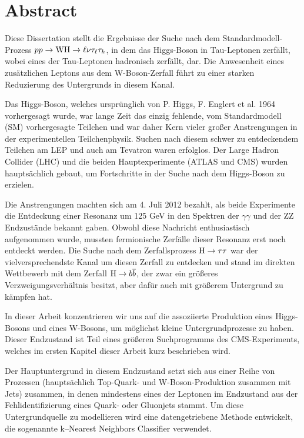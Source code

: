 \chapter*{Abstract}

Diese Dissertation stellt die Ergebnisse der Suche nach dem Standardmodell-Prozess $pp \rightarrow \mathrm{W}\mathrm{H} \rightarrow \ell \nu \tau_\ell \tau_h$, in dem das Higgs-Boson in Tau-Leptonen zerf\"allt, wobei eines der Tau-Leptonen hadronisch zerf\"allt, dar. Die Anwesenheit eines zus\"atzlichen Leptons aus dem W-Boson-Zerfall f\"uhrt zu einer starken Reduzierung des Untergrunds in diesem Kanal.

Das Higgs-Boson, welches urspr\"unglich von P. Higgs, F. Englert et al. 1964 vorhergesagt wurde, war lange Zeit das einzig fehlende, vom Standardmodell (SM) vorhergesagte Teilchen und war daher Kern vieler gro\ss{}er Anstrengungen in der experimentellen Teilchenphysik. Suchen nach diesem schwer zu entdeckendem Teilchen am LEP und auch am Tevatron waren erfolglos. Der Large Hadron Collider (LHC) und die beiden Hauptexperimente (ATLAS und CMS) wurden haupts\"achlich gebaut, um Fortschritte in der Suche nach dem Higgs-Boson zu erzielen.

Die Anstrengungen machten sich am 4. Juli 2012 bezahlt, als beide Experimente die Entdeckung einer Resonanz um 125 GeV in den Spektren der $\gamma \gamma$ und der ZZ Endzust\"ande bekannt gaben. Obwohl diese Nachricht enthusiastisch aufgenommen wurde, mussten fermionische Zerf\"alle dieser Resonanz erst noch entdeckt werden. Die Suche nach dem Zerfallsprozess $\mathrm{H} \rightarrow \tau \tau$ war der vielversprechendste Kanal um diesen Zerfall zu entdecken und stand im direkten Wettbewerb mit dem Zerfall $\mathrm{H} \rightarrow b\overline{b}$, der zwar ein gr\"o\ss{}eres Verzweigungsverh\"altnis besitzt, aber daf\"ur auch mit gr\"o\ss{}erem Untergrund zu k\"ampfen hat.

In dieser Arbeit konzentrieren wir uns auf die assoziierte Produktion eines Higgs-Bosons und eines W-Bosons, um m\"oglichst kleine Untergrundprozesse zu haben. Dieser Endzustand ist Teil eines gr\"o\ss{}eren Suchprogramms des CMS-Experiments, welches im ersten Kapitel dieser Arbeit kurz beschrieben wird.

Der Hauptuntergrund in diesem Endzustand setzt sich aus einer Reihe von Prozessen (haupts\"achlich Top-Quark- und W-Boson-Produktion zusammen mit Jets) zusammen, in denen mindestens eines der Leptonen im Endzustand aus der Fehlidentifizierung eines Quark- oder Gluonjets stammt. Um diese Untergrundquelle zu modellieren wird eine datengetriebene Methode entwickelt, die sogenannte k--Nearest Neighbors Classifier verwendet.

